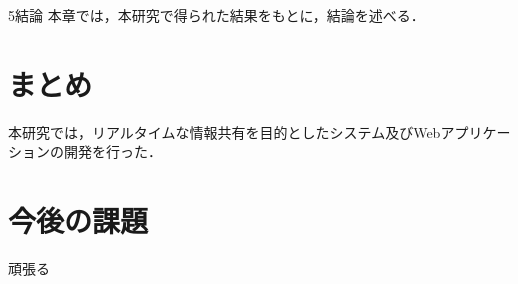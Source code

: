 \chapterhead
{5}{結論}
{本章では，本研究で得られた結果をもとに，結論を述べる．}

\section{まとめ}
本研究では，リアルタイムな情報共有を目的としたシステム及びWebアプリケーションの開発を行った．

\section{今後の課題}
頑張る
